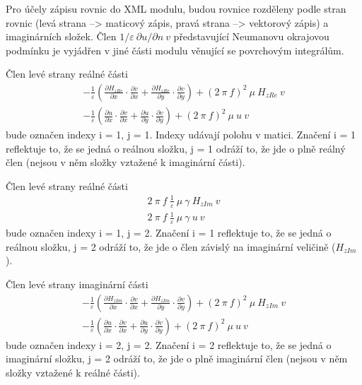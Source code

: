 \documentclass[12pt,a4paper,oneside]{article}
\numberwithin{equation}{section} %
\numberwithin{figure}{section} %
\numberwithin{table}{section} %
\begin{document}
Pro účely zápisu rovnic do XML modulu, budou rovnice rozděleny podle stran rovnic (levá strana --> maticový zápis, pravá strana --> vektorový zápis) a imaginárních složek. Člen $1/ \varepsilon ~ \partial u / \partial n ~ v$ představující Neumanovu okrajovou podmínku je vyjádřen v jiné části modulu věnující se povrchovým integrálům.

Člen levé strany reálné části
\begin{subequations}
\begin{gather}
- \frac{1}{\varepsilon} \left( \frac{\partial H _{zRe}}{\partial x} \cdot \frac{\partial v}{\partial x} + \frac{\partial H _{zRe}}{\partial y} \cdot \frac{\partial v}{\partial y} \right) + (2 ~ \pi ~ f) ^2 ~ \mu ~ H _{zRe} ~ v
\\
- \frac{1}{\varepsilon} \left( \frac{\partial u}{\partial x} \cdot \frac{\partial v}{\partial x} + \frac{\partial u}{\partial y} \cdot \frac{\partial v}{\partial y} \right) + (2 ~ \pi ~ f) ^2 ~ \mu ~ u ~ v
\end{gather}
\end{subequations}
bude označen indexy i = 1, j = 1. Indexy udávají polohu v matici. Značení i = 1 reflektuje to, že se jedná o reálnou složku, j = 1 odráží to, že jde o plně reálný člen (nejsou v něm složky vztažené k imaginární části). 

Člen levé strany reálné části
\begin{subequations}
\begin{gather}
2 ~ \pi ~ f ~ \frac{1}{\varepsilon} ~ \mu ~ \gamma ~ H _{zIm} ~ v
\\
2 ~ \pi ~ f ~ \frac{1}{\varepsilon} ~ \mu ~ \gamma ~ u ~ v
\end{gather}
\end{subequations}
bude označen indexy i = 1, j = 2. Značení i = 1 reflektuje to, že se jedná o reálnou složku, j = 2 odráží to, že jde o člen závislý na imaginární veličině ($H _{zIm}$).


Člen levé strany imaginární části
\begin{subequations}
\begin{gather}
- \frac{1}{\varepsilon} \left( \frac{\partial H _{zIm}}{\partial x} \cdot \frac{\partial v}{\partial x} + \frac{\partial H _{zIm}}{\partial y} \cdot \frac{\partial v}{\partial y} \right) + (2 ~ \pi ~ f) ^2 ~ \mu ~ H _{zIm} ~ v
\\
- \frac{1}{\varepsilon} \left( \frac{\partial u}{\partial x} \cdot \frac{\partial v}{\partial x} + \frac{\partial u}{\partial y} \cdot \frac{\partial v}{\partial y} \right) + (2 ~ \pi ~ f) ^2 ~ \mu ~ u ~ v
\end{gather}
\end{subequations}
bude označen indexy i = 2, j = 2. Značení i = 2 reflektuje to, že se jedná o imaginární složku, j = 2 odráží to, že jde o plně imaginární člen (nejsou v něm složky vztažené k reálné části). 
\end{document}
